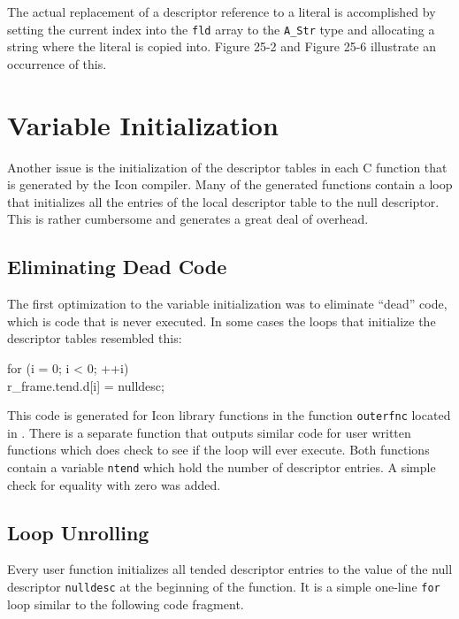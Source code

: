 The actual replacement of a descriptor reference to a literal is
accomplished by setting the current index into the \texttt{fld} array
to the \texttt{A\_Str} type and allocating a string where the literal
is copied into. Figure 25-2 and Figure 25-6 illustrate an occurrence
of this.

\section{Variable Initialization}

Another issue is the initialization of the descriptor tables in each C
function that is generated by the Icon compiler.  Many of the
generated functions contain a loop that initializes all the entries of
the local descriptor table to the null descriptor. This is rather
cumbersome and generates a great deal of overhead.


\subsection{Eliminating Dead Code}

The first optimization to the variable initialization was to eliminate
``dead'' code, which is code that is never executed. In some cases the
loops that initialize the descriptor tables resembled this:

\goodbreak
\begin{iconcode}
for (i = 0; i < 0; ++i)\\
\>r\_frame.tend.d[i] = nulldesc;\\
\end{iconcode}


This code is generated for Icon library functions in the function
\texttt{outerfnc} located in . There is a separate
function that outputs similar code for user written functions which
does check to see if the loop will ever execute. Both functions
contain a variable \texttt{ntend} which hold the number of descriptor
entries. A simple check for equality with zero was added.

\subsection{Loop Unrolling}

Every user function initializes all tended descriptor entries to the
value of the null descriptor \texttt{nulldesc} at the beginning of the
function. It is a simple one-line \texttt{for} loop similar to the
following code fragment.

